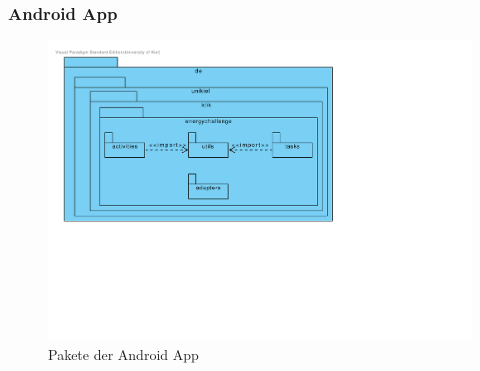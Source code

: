 
\subsubsection{Android App}

\begin{figure}[H]
  \centering
  \includegraphics[width=\textwidth, trim=1cm 7cm 9cm 1cm, clip]{gfx/app_package_diagram}
  \caption{Pakete der Android App}
\end{figure}

